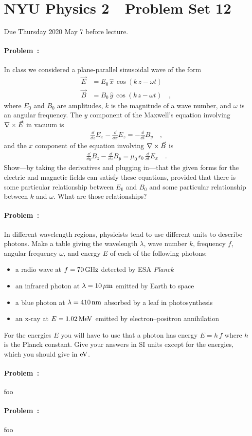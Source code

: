 \documentclass[12pt]{article}
\begin{document}
\section*{NYU Physics 2---Problem Set 12}

Due Thursday 2020 May 7 before lecture.

\paragraph{Problem~\theproblem:}%
In class we considered a plane-parallel sinusoidal wave of the form
\begin{align}
  \vec{E} &= E_0\,\hat{x}\,\cos(k\,z - \omega t) \\
  \vec{B} &= B_0\,\hat{y}\,\cos(k\,z - \omega t) \quad ,
\end{align}
where $E_0$ and $B_0$ are amplitudes, $k$ is the magnitude of a
wave number, and $\omega$ is an angular frequency.
The $y$ component of the Maxwell's equation involving
$\nabla\times{\vec{E}}$ in vacuum is
\begin{align}
  \frac{\dd}{\dd z}E_x - \frac{\dd}{\dd x}E_z = -\frac{\dd}{\dd t}B_y
  \quad ,
\end{align}
and the $x$ component of the equation involving $\nabla\times{\vec{B}}$ is
\begin{align}
  \frac{\dd}{\dd y}B_z - \frac{\dd}{\dd z}B_y = \mu_0\,\epsilon_0\,\frac{\dd}{\dd t}E_x
  \quad .
\end{align}
Show---by taking the derivatives and plugging in---that the given forms
for the electric and magnetic fields can
satisfy these equations, provided that there is some particular relationship
between $E_0$ and $B_0$ and some particular relationship between $k$ and $\omega$.
What are those relationships?

\paragraph{Problem~\theproblem:}%
In different wavelength regions, physicists tend to use different
units to describe photons. Make a table giving the wavelength
$\lambda$, wave number $k$, frequency $f$, angular frequency $\omega$,
and energy $E$ of each of the following photons:
\begin{itemize}
\item a radio wave at $f=70\,\mathrm{GHz}$ detected by ESA \textsl{Planck}
\item an infrared photon at $\lambda=10\,\mathrm{\mu m}$ emitted by Earth to space
\item a blue photon at $\lambda=410\,\mathrm{nm}$ absorbed by a leaf in photosynthesis
\item an x-ray at $E=1.02\,\mathrm{MeV}$ emitted by electron--positron annihilation
\end{itemize}
For the energies $E$ you will have to use that a photon has energy $E=h\,f$
where $h$ is the Planck constant. Give your answers in SI units except for the
energies, which you should give in $\mathrm{eV}$.

\paragraph{Problem~\theproblem:}%
foo

\paragraph{Problem~\theproblem:}%
foo
\end{document}
